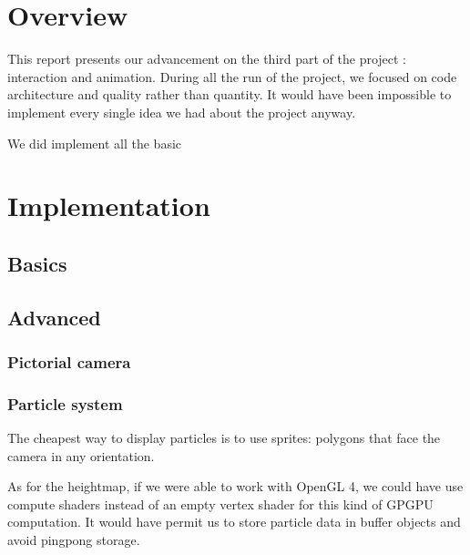 \documentclass[a4paper,11pt]{article}
\begin{document}
\section{Overview}

This report presents our advancement on the third part of the project : interaction and animation. During all the run of the project, we focused on code architecture and quality rather than quantity. It would have been impossible to implement every single idea we had about the project anyway.

We did implement all the basic

\section{Implementation}

\subsection{Basics}

\subsection{Advanced}

\subsubsection{Pictorial camera}


\subsubsection{Particle system}

The cheapest way to display particles is to use sprites: polygons that face the camera
in any orientation.

As for the heightmap, if we were able to work with OpenGL 4, we could have use compute shaders instead of an empty vertex shader for this kind of GPGPU computation. It would have permit us to store particle data in buffer objects and avoid pingpong storage.
\end{document}
